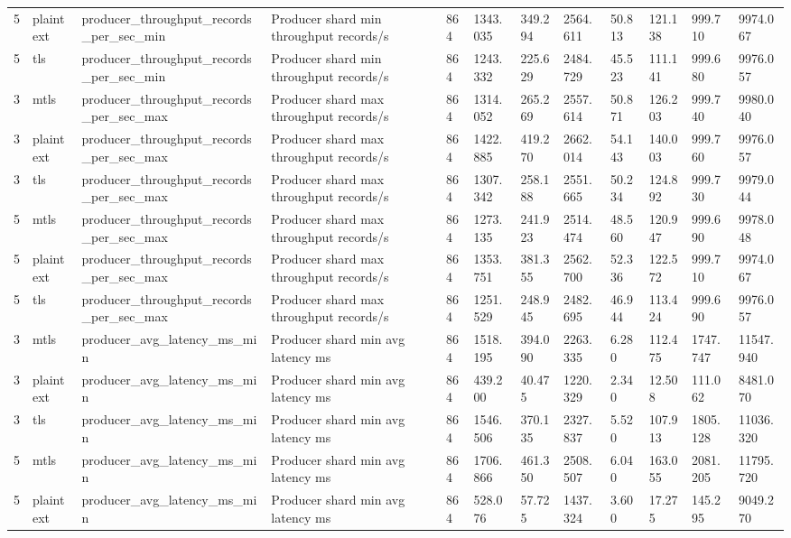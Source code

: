 \begin{longtable}{llllllllllll}
5 & plaintext & producer\_throughput\_records\_per\_sec\_min & Producer shard min throughput records/s & 864 & 1343.035 & 349.294 & 2564.611 & 50.813 & 121.138 & 999.710 & 9974.067 \\
5 & tls & producer\_throughput\_records\_per\_sec\_min & Producer shard min throughput records/s & 864 & 1243.332 & 225.629 & 2484.729 & 45.523 & 111.141 & 999.680 & 9976.057 \\
3 & mtls & producer\_throughput\_records\_per\_sec\_max & Producer shard max throughput records/s & 864 & 1314.052 & 265.269 & 2557.614 & 50.871 & 126.203 & 999.740 & 9980.040 \\
3 & plaintext & producer\_throughput\_records\_per\_sec\_max & Producer shard max throughput records/s & 864 & 1422.885 & 419.270 & 2662.014 & 54.143 & 140.003 & 999.760 & 9976.057 \\
3 & tls & producer\_throughput\_records\_per\_sec\_max & Producer shard max throughput records/s & 864 & 1307.342 & 258.188 & 2551.665 & 50.234 & 124.892 & 999.730 & 9979.044 \\
5 & mtls & producer\_throughput\_records\_per\_sec\_max & Producer shard max throughput records/s & 864 & 1273.135 & 241.923 & 2514.474 & 48.560 & 120.947 & 999.690 & 9978.048 \\
5 & plaintext & producer\_throughput\_records\_per\_sec\_max & Producer shard max throughput records/s & 864 & 1353.751 & 381.355 & 2562.700 & 52.336 & 122.572 & 999.710 & 9974.067 \\
5 & tls & producer\_throughput\_records\_per\_sec\_max & Producer shard max throughput records/s & 864 & 1251.529 & 248.945 & 2482.695 & 46.944 & 113.424 & 999.690 & 9976.057 \\
3 & mtls & producer\_avg\_latency\_ms\_min & Producer shard min avg latency ms & 864 & 1518.195 & 394.090 & 2263.335 & 6.280 & 112.475 & 1747.747 & 11547.940 \\
3 & plaintext & producer\_avg\_latency\_ms\_min & Producer shard min avg latency ms & 864 & 439.200 & 40.475 & 1220.329 & 2.340 & 12.508 & 111.062 & 8481.070 \\
3 & tls & producer\_avg\_latency\_ms\_min & Producer shard min avg latency ms & 864 & 1546.506 & 370.135 & 2327.837 & 5.520 & 107.913 & 1805.128 & 11036.320 \\
5 & mtls & producer\_avg\_latency\_ms\_min & Producer shard min avg latency ms & 864 & 1706.866 & 461.350 & 2508.507 & 6.040 & 163.055 & 2081.205 & 11795.720 \\
5 & plaintext & producer\_avg\_latency\_ms\_min & Producer shard min avg latency ms & 864 & 528.076 & 57.725 & 1437.324 & 3.600 & 17.275 & 145.295 & 9049.270 \\

\end{longtable}

